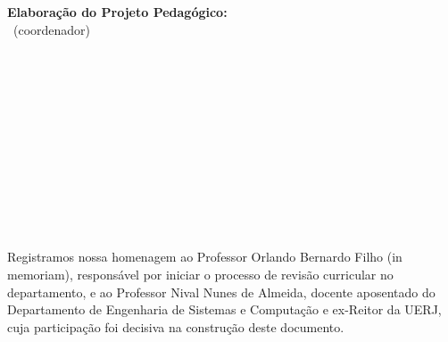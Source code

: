 \documentclass[oneside,envcountsame,envcountchap,openany]{svmono}
\begin{document}
\vspace*{\fill}


\textbf{Elaboração do Projeto Pedagógico:}\\[0.5em]
\araujo~(coordenador)\\
\cristiana\\ \felipe\\ \gabriel\\ \giomar\\ \luiza\\ \luigi\\ \margareth\\ \rafaela\\ \robert\\ \silas\\ \simone\\ \thiago\\[1em]


Registramos nossa homenagem ao Professor Orlando Bernardo Filho (in memoriam), responsável por iniciar o processo de revisão curricular no departamento, e ao Professor Nival Nunes de Almeida, docente aposentado do Departamento de Engenharia de Sistemas e Computação e ex-Reitor da UERJ, cuja participação foi decisiva na construção deste documento.


\vspace*{\fill}



\newpage

\tableofcontents
\thispagestyle{plain}
\listoftables
\clearpage

\frontmatter%

\mainmatter%

\clearpage
\pagestyle{fancy}













\end{document}
